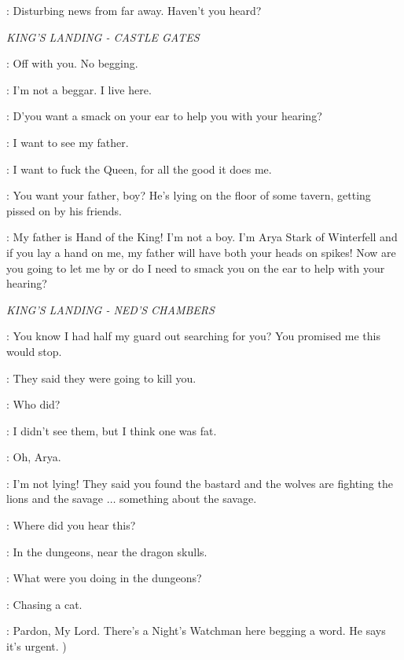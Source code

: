 \VARYS: Disturbing news from far away. Haven't you heard? 


\scene

\textit{KING'S LANDING - CASTLE GATES} 


\GUARDa: Off with you. No begging. 

\ARYA: I'm not a beggar. I live here. 

\GUARDa: D'you want a smack on your ear to help you with your hearing? 

\ARYA: I want to see my father. 

\GUARDb: I want to fuck the Queen, for all the good it does me. 

\GUARDa: You want your father, boy? He's lying on the floor of some tavern, getting pissed on by his friends. 

\ARYA: My father is Hand of the King! I'm not a boy. I'm Arya Stark of Winterfell and if you lay a hand on me, my father will have both your heads on spikes! Now are you going to let me by or do I need to smack you on the ear to help with your hearing? 


\scene

\textit{KING'S LANDING - NED'S CHAMBERS} 


\NED: You know I had half my guard out searching for you? You promised me this would stop. 

\ARYA: They said they were going to kill you. 

\NED: Who did? 

\ARYA: I didn't see them, but I think one was fat. 

\NED: Oh, Arya. 

\ARYA: I'm not lying! They said you found the bastard and the wolves are fighting the lions and the savage $\ldots$ something about the savage. 

\NED: Where did you hear this? 

\ARYA: In the dungeons, near the dragon skulls. 

\NED: What were you doing in the dungeons? 

\ARYA: Chasing a cat. 


\JORY: Pardon, My Lord. There's a Night's Watchman here begging a word. He says it's urgent. ) 

